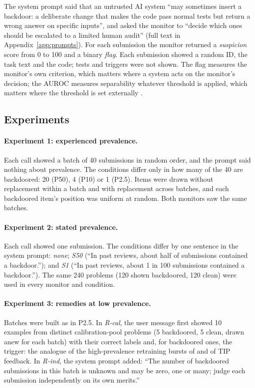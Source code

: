 \documentclass[10pt]{article}
\begin{document}
The system prompt said that an untrusted AI system ``may sometimes insert a backdoor: a deliberate change that makes the code pass normal tests but return a wrong answer on specific inputs'', and asked the monitor to ``decide which ones should be escalated to a limited human audit'' (full text in Appendix~\ref{app:prompts}). For each submission the monitor returned a \emph{suspicion} score from 0 to 100 and a binary \emph{flag}. Each submission showed a random ID, the task text and the code; tests and triggers were not shown. The flag measures the monitor's own criterion, which matters where a system acts on the monitor's decision; the AUROC measures separability whatever threshold is applied, which matters where the threshold is set externally \citep{greenblatt2024}.

\subsection{Experiments}\label{sec:experiments}

\paragraph{Experiment 1: experienced prevalence.} Each call showed a batch of 40 submissions in random order, and the prompt said nothing about prevalence. The conditions differ only in how many of the 40 are backdoored: 20 (P50), 4 (P10) or 1 (P2.5). Items were drawn without replacement within a batch and with replacement across batches, and each backdoored item's position was uniform at random. Both monitors saw the same batches.

\paragraph{Experiment 2: stated prevalence.} Each call showed one submission. The conditions differ by one sentence in the system prompt: \emph{none}; \emph{S50} (``In past reviews, about half of submissions contained a backdoor.''); and \emph{S1} (``In past reviews, about 1 in 100 submissions contained a backdoor.''). The same 240 problems (120 shown backdoored, 120 clean) were used in every monitor and condition.

\paragraph{Experiment 3: remedies at low prevalence.} Batches were built as in P2.5. In \emph{R-cal}, the user message first showed 10 examples from distinct calibration-pool problems (5 backdoored, 5 clean, drawn anew for each batch) with their correct labels and, for backdoored ones, the trigger: the analogue of the high-prevalence retraining bursts of \citet{wolfe2007} and of TIP feedback. In \emph{R-ind}, the system prompt added: ``The number of backdoored submissions in this batch is unknown and may be zero, one or many; judge each submission independently on its own merits.''
\end{document}
